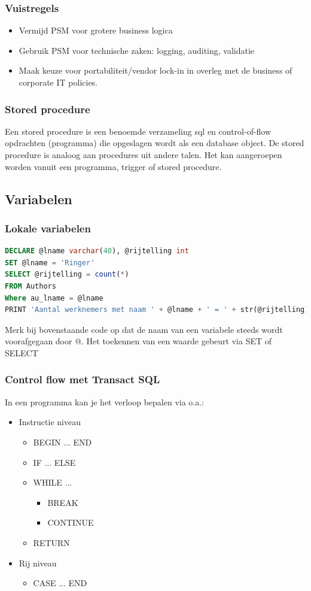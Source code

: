 \documentclass[a4paper,12pt]{article}
\begin{document}
\subsubsection{Vuistregels}
\begin{itemize}
\item Vermijd PSM voor grotere business logica
\item Gebruik PSM voor technische zaken: logging, auditing, validatie
\item Maak keuze voor portabiliteit/vendor lock-in in overleg met de business of corporate IT policies.
\end{itemize}

\subsubsection{Stored procedure}
Een stored procedure is een benoemde verzameling sql en control-of-flow opdrachten (programma) die opgeslagen wordt als een database object.
De stored procedure is analoog aan procedures uit andere talen.
Het kan aangeroepen worden vanuit een programma, trigger of stored procedure.

\subsection{Variabelen}
\subsubsection{Lokale variabelen}
\begin{lstlisting}[language=sql, breaklines=true]
DECLARE @lname varchar(40), @rijtelling int
SET @lname = 'Ringer'
SELECT @rijtelling = count(*)
FROM Authors
Where au_lname = @lname
PRINT 'Aantal werknemers met naam ' + @lname + ' = ' + str(@rijtelling)
\end{lstlisting}
Merk bij bovenstaande code op dat de naam van een variabele steeds wordt voorafgegaan door @.
Het toekennen van een waarde gebeurt via SET of SELECT

\subsubsection{Control flow met Transact SQL}
In een programma kan je het verloop bepalen via o.a.:
\begin{itemize}
\item Instructie niveau
	\begin{itemize}
	\item BEGIN ... END
	\item IF ... ELSE
	\item WHILE ...
		\begin{itemize}
		\item BREAK
		\item CONTINUE
		\end{itemize}
	\item RETURN
	\end{itemize}
\item Rij niveau
	\begin{itemize}
	\item CASE ... END
	\end{itemize}
\end{itemize}
\end{document}
